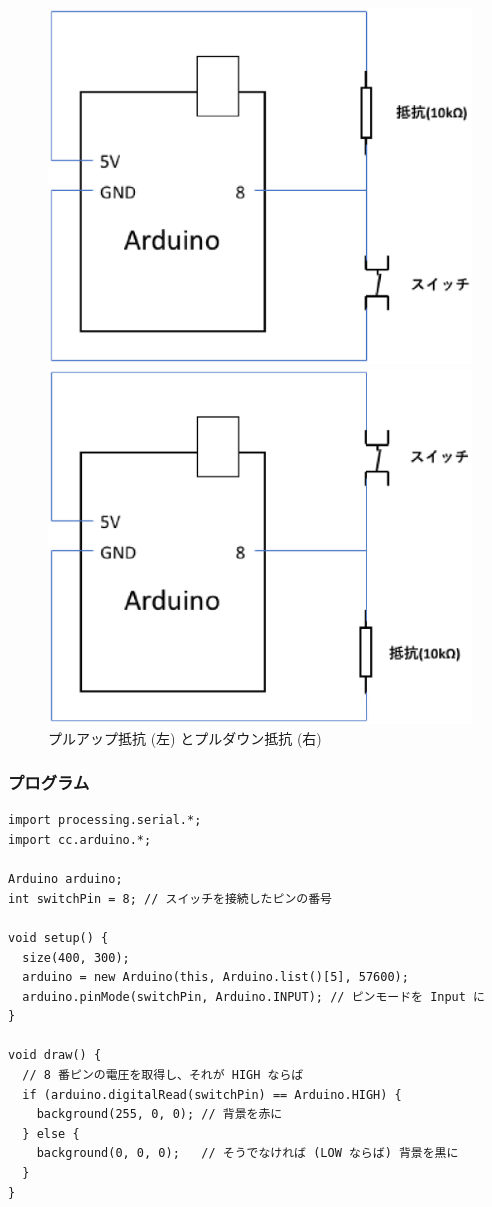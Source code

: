 \documentclass[11pt,a4paper]{jarticle}
\begin{document}
\begin{figure}[h!]
 \begin{minipage}{0.5\columnwidth}
  \centering
  \includegraphics[width=0.7\columnwidth]{img/eps/pull_up.eps}
 \end{minipage}
 \begin{minipage}{0.5\columnwidth}
  \centering
  \includegraphics[width=0.7\columnwidth]{img/eps/pull_down.eps}
 \end{minipage}
  \caption{プルアップ抵抗 (左) とプルダウン抵抗 (右)}
\end{figure}

\newpage

\subsubsection*{プログラム}
\begin{lstlisting}
import processing.serial.*;
import cc.arduino.*;

Arduino arduino;
int switchPin = 8; // スイッチを接続したピンの番号
 
void setup() {
  size(400, 300);
  arduino = new Arduino(this, Arduino.list()[5], 57600);
  arduino.pinMode(switchPin, Arduino.INPUT); // ピンモードを Input に
}
 
void draw() {
  // 8 番ピンの電圧を取得し、それが HIGH ならば
  if (arduino.digitalRead(switchPin) == Arduino.HIGH) {
    background(255, 0, 0); // 背景を赤に
  } else {
    background(0, 0, 0);   // そうでなければ (LOW ならば) 背景を黒に
  }
}
\end{lstlisting}
\end{document}
